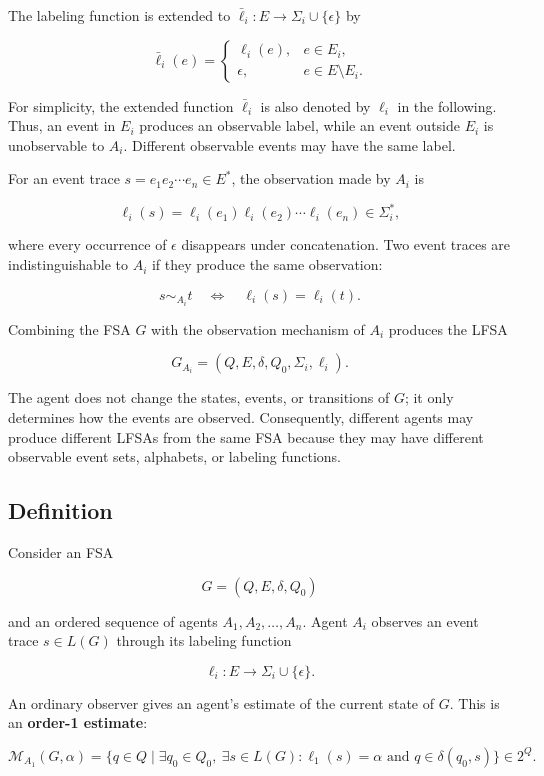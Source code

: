 \documentclass[11pt]{article}
\begin{document}
The labeling function is extended to $\bar{\ell}_i:E\rightarrow\Sigma_i\cup\{\epsilon\}$ by

\[
\bar{\ell}_i(e)=
\begin{cases}
\ell_i(e), & e\in E_i,\\
\epsilon, & e\in E\setminus E_i.
\end{cases}
\]

For simplicity, the extended function $\bar{\ell}_i$ is also denoted by $\ell_i$ in the following. Thus, an event in $E_i$ produces an observable label, while an event outside $E_i$ is unobservable to $A_i$. Different observable events may have the same label.

For an event trace $s=e_1e_2\cdots e_n\in E^*$, the observation made by $A_i$ is

\[
\ell_i(s)=\ell_i(e_1)\ell_i(e_2)\cdots\ell_i(e_n)\in\Sigma_i^*,
\]

where every occurrence of $\epsilon$ disappears under concatenation. Two event traces are indistinguishable to $A_i$ if they produce the same observation:

\[
s\sim_{A_i}t
\quad\Longleftrightarrow\quad
\ell_i(s)=\ell_i(t).
\]

Combining the FSA $G$ with the observation mechanism of $A_i$ produces the LFSA

\[
G_{A_i}=(Q,E,\delta,Q_0,\Sigma_i,\ell_i).
\]

The agent does not change the states, events, or transitions of $G$; it only determines how the events are observed. Consequently, different agents may produce different LFSAs from the same FSA because they may have different observable event sets, alphabets, or labeling functions.

\subsection{Definition}

Consider an FSA

\[
G=(Q,E,\delta,Q_0)
\]

\noindent
and an ordered sequence of agents $A_1,A_2,\ldots,A_n$. Agent $A_i$ observes an event trace $s\in L(G)$ through its labeling function

\[
\ell_i:E\rightarrow\Sigma_i\cup\{\epsilon\}.
\]

An ordinary observer gives an agent's estimate of the current state of $G$. This is an \textbf{order-1 estimate}:

\[
\mathcal M_{A_1}(G,\alpha)
=\{q\in Q\mid
\exists q_0\in Q_0,\ 
\exists s\in L(G):
\ell_1(s)=\alpha
\text{ and }
q\in\delta(q_0,s)\}
\in 2^Q.
\]
\end{document}
